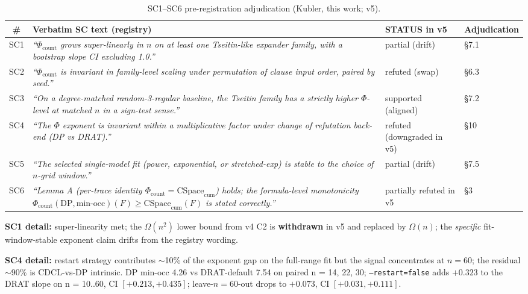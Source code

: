 \documentclass[11pt,a4paper]{article}
\theoremstyle{remark}
\begin{document}
\begin{table}[!htbp]
\centering
\footnotesize
\renewcommand{\arraystretch}{1.15}
\begin{tabularx}{\textwidth}{@{}c >{\raggedright\arraybackslash}X l l@{}}
\toprule
\# & Verbatim SC text (registry) & STATUS in v5 & Adjudication \\
\midrule
SC1 & \textit{``$\Phi_{\mathrm{count}}$ grows super-linearly in $n$ on at
least one Tseitin-like expander family, with a bootstrap slope CI
excluding 1.0.''} & partial (drift) & \S7.1 \\
SC2 & \textit{``$\Phi_{\mathrm{count}}$ is invariant in family-level
scaling under permutation of clause input order, paired by seed.''} &
refuted (swap) & \S6.3 \\
SC3 & \textit{``On a degree-matched random-3-regular baseline, the
Tseitin family has a strictly higher $\Phi$-level at matched $n$ in a
sign-test sense.''} & supported (aligned) & \S7.2 \\
SC4 & \textit{``The $\Phi$ exponent is invariant within a multiplicative
factor under change of refutation back-end (DP vs DRAT).''} & refuted
(downgraded in v5) & \S10 \\
SC5 & \textit{``The selected single-model fit (power, exponential, or
stretched-exp) is stable to the choice of $n$-grid window.''} & partial
(drift) & \S7.5 \\
SC6 & \textit{``Lemma A (per-trace identity
$\Phi_{\mathrm{count}} = \mathrm{CSpace}_{\mathrm{cum}}$) holds; the
formula-level monotonicity
$\Phi_{\mathrm{count}}(\mathrm{DP}, \mathrm{min\text{-}occ})(F) \ge
\mathrm{CSpace}_{\mathrm{cum}}(F)$ is stated correctly.''} & partially
refuted in v5 & \S3 \\
\bottomrule
\end{tabularx}
\caption{SC1--SC6 pre-registration adjudication (Kubler, this work; v5).}
\label{tab:sc-adjudication}
\end{table}

\textbf{SC1 detail:} super-linearity met; the $\Omega(n^2)$ lower bound
from v4 C2 is \textbf{withdrawn} in v5 and replaced by $\Omega(n)$; the
\emph{specific} fit-window-stable exponent claim drifts from the registry
wording.

\textbf{SC4 detail:} restart strategy contributes $\sim$10\% of the
exponent gap on the full-range fit but the signal concentrates at $n=60$;
the residual $\sim$90\% is CDCL-vs-DP intrinsic. DP min-occ 4.26 vs
DRAT-default 7.54 on paired n = 14, 22, 30;
\texttt{--restart=false} adds $+0.323$ to the DRAT slope on
n = 10..60, CI $[+0.213, +0.435]$; leave-$n=60$-out drops to $+0.073$,
CI $[+0.031, +0.111]$.
\end{document}

